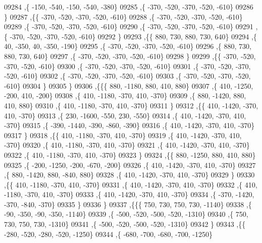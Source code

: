 \begin{DoxyCode}
09284     ,\{  -150,  -540,  -150,  -540,  -380\}
09285     ,\{  -370,  -520,  -370,  -520,  -610\}
09286     \}
09287    ,\{\{  -370,  -520,  -370,  -520,  -610\}
09288     ,\{  -370,  -520,  -370,  -520,  -610\}
09289     ,\{  -370,  -520,  -370,  -520,  -610\}
09290     ,\{  -370,  -520,  -370,  -520,  -610\}
09291     ,\{  -370,  -520,  -370,  -520,  -610\}
09292     \}
09293    ,\{\{   880,   730,   880,   730,   640\}
09294     ,\{    40,  -350,    40,  -350,  -190\}
09295     ,\{  -370,  -520,  -370,  -520,  -610\}
09296     ,\{   880,   730,   880,   730,   640\}
09297     ,\{  -370,  -520,  -370,  -520,  -610\}
09298     \}
09299    ,\{\{  -370,  -520,  -370,  -520,  -610\}
09300     ,\{  -370,  -520,  -370,  -520,  -610\}
09301     ,\{  -370,  -520,  -370,  -520,  -610\}
09302     ,\{  -370,  -520,  -370,  -520,  -610\}
09303     ,\{  -370,  -520,  -370,  -520,  -610\}
09304     \}
09305    \}
09306   ,\{\{\{   880, -1180,   880,   410,   880\}
09307     ,\{   410, -1250,  -200,   410,  -200\}
09308     ,\{   410, -1180,  -370,   410,  -370\}
09309     ,\{   880, -1420,   880,   410,   880\}
09310     ,\{   410, -1180,  -370,   410,  -370\}
09311     \}
09312    ,\{\{   410, -1420,  -370,   410,  -370\}
09313     ,\{   230, -1600,  -550,   230,  -550\}
09314     ,\{   410, -1420,  -370,   410,  -370\}
09315     ,\{  -390, -1440,  -390,  -860,  -390\}
09316     ,\{   410, -1420,  -370,   410,  -370\}
09317     \}
09318    ,\{\{   410, -1180,  -370,   410,  -370\}
09319     ,\{   410, -1420,  -370,   410,  -370\}
09320     ,\{   410, -1180,  -370,   410,  -370\}
09321     ,\{   410, -1420,  -370,   410,  -370\}
09322     ,\{   410, -1180,  -370,   410,  -370\}
09323     \}
09324    ,\{\{   880, -1250,   880,   410,   880\}
09325     ,\{  -200, -1250,  -200,  -670,  -200\}
09326     ,\{   410, -1420,  -370,   410,  -370\}
09327     ,\{   880, -1420,   880,  -840,   880\}
09328     ,\{   410, -1420,  -370,   410,  -370\}
09329     \}
09330    ,\{\{   410, -1180,  -370,   410,  -370\}
09331     ,\{   410, -1420,  -370,   410,  -370\}
09332     ,\{   410, -1180,  -370,   410,  -370\}
09333     ,\{   410, -1420,  -370,   410,  -370\}
09334     ,\{  -370, -1420,  -370,  -840,  -370\}
09335     \}
09336    \}
09337   ,\{\{\{   750,   730,   750,   730, -1140\}
09338     ,\{   -90,  -350,   -90,  -350, -1140\}
09339     ,\{  -500,  -520,  -500,  -520, -1310\}
09340     ,\{   750,   730,   750,   730, -1310\}
09341     ,\{  -500,  -520,  -500,  -520, -1310\}
09342     \}
09343    ,\{\{  -280,  -520,  -280,  -520, -1250\}
09344     ,\{  -680,  -700,  -680,  -700, -1250\}

\end{DoxyCode}
